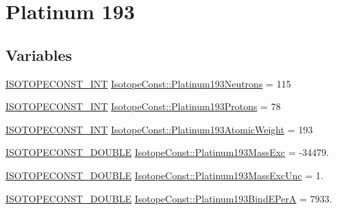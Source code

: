 \hypertarget{group___isotope_const-_platinum-_pt193}{}\section{Platinum 193}
\label{group___isotope_const-_platinum-_pt193}
\subsection*{Variables}
\begin{DoxyCompactItemize}
\item 
\mbox{\hyperlink{group___isotope_const-_macros_ga5f18360b3e99483a35c32d789e62621c}{I\+S\+O\+T\+O\+P\+E\+C\+O\+N\+S\+T\+\_\+\+I\+NT}} \mbox{\hyperlink{group___isotope_const-_platinum-_pt193_ga2debcdf6f23e0eb63dd89aaf9baec106}{Isotope\+Const\+::\+Platinum193\+Neutrons}} = 115
\item 
\mbox{\hyperlink{group___isotope_const-_macros_ga5f18360b3e99483a35c32d789e62621c}{I\+S\+O\+T\+O\+P\+E\+C\+O\+N\+S\+T\+\_\+\+I\+NT}} \mbox{\hyperlink{group___isotope_const-_platinum-_pt193_ga1f89c336e23ec93e49c1200ce5de73e8}{Isotope\+Const\+::\+Platinum193\+Protons}} = 78
\item 
\mbox{\hyperlink{group___isotope_const-_macros_ga5f18360b3e99483a35c32d789e62621c}{I\+S\+O\+T\+O\+P\+E\+C\+O\+N\+S\+T\+\_\+\+I\+NT}} \mbox{\hyperlink{group___isotope_const-_platinum-_pt193_gad6f83d84ffd95b36f911c73458ccd7ab}{Isotope\+Const\+::\+Platinum193\+Atomic\+Weight}} = 193
\item 
\mbox{\hyperlink{group___isotope_const-_macros_ga8f45a7272ce02c0b4c65c44636ed719a}{I\+S\+O\+T\+O\+P\+E\+C\+O\+N\+S\+T\+\_\+\+D\+O\+U\+B\+LE}} \mbox{\hyperlink{group___isotope_const-_platinum-_pt193_ga36daaa1fbb62b88ad8a1c2a73b074db8}{Isotope\+Const\+::\+Platinum193\+Mass\+Exc}} = -\/34479.
\item 
\mbox{\hyperlink{group___isotope_const-_macros_ga8f45a7272ce02c0b4c65c44636ed719a}{I\+S\+O\+T\+O\+P\+E\+C\+O\+N\+S\+T\+\_\+\+D\+O\+U\+B\+LE}} \mbox{\hyperlink{group___isotope_const-_platinum-_pt193_ga823b558a0df891378c5a461c782d0050}{Isotope\+Const\+::\+Platinum193\+Mass\+Exc\+Unc}} = 1.
\item 
\mbox{\hyperlink{group___isotope_const-_macros_ga8f45a7272ce02c0b4c65c44636ed719a}{I\+S\+O\+T\+O\+P\+E\+C\+O\+N\+S\+T\+\_\+\+D\+O\+U\+B\+LE}} \mbox{\hyperlink{group___isotope_const-_platinum-_pt193_ga4ec22c771b2d55701623ef5bf7bda71f}{Isotope\+Const\+::\+Platinum193\+Bind\+E\+PerA}} = 7933.
\item 

\end{DoxyCompactItemize}
